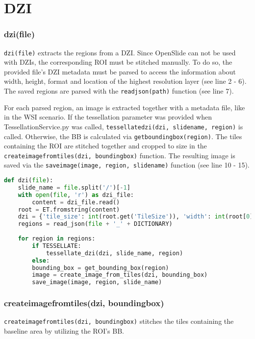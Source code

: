 \section{DZI}

\subsubsection{dzi(file)}
\texttt{dzi(file)} extracts the regions from a DZI. Since OpenSlide can not be used with DZIs, the corresponding ROI must be stitched manually. To do so, the provided file's DZI metadata must be parsed to access the information about width, height, format and location of the highest resolution layer (see line 2 - 6). The saved regions are parsed with the \texttt{read{\textunderscore}json(path)} function (see line 7).

For each parsed region, an image is extracted together with a metadata file, like in the WSI scenario. If the tessellation parameter was provided when TessellationService.py was called, \texttt{tessellate{\textunderscore}dzi(dzi, slide{\textunderscore}name, region)} is called. Otherwise, the BB is calculated via \texttt{get{\textunderscore}bounding{\textunderscore}box(region)}. The tiles containing the ROI are stitched together and cropped to size in the \texttt{create{\textunderscore}image{\textunderscore}from{\textunderscore}tiles(dzi, bounding{\textunderscore}box)} function. The resulting image is saved via the \texttt{save{\textunderscore}image(image, region, slide{\textunderscore}name)} function (see line 10 - 15).

\begin{lstlisting}[frame=single,language=python]
def dzi(file):
	slide_name = file.split('/')[-1]
	with open(file, 'r') as dzi_file:
		content = dzi_file.read()
	root = ET.fromstring(content)
	dzi = {'tile_size': int(root.get('TileSize')), 'width': int(root[0].get('Width')), 'height': int(root[0].get('Height')), 'tile_source': get_tile_source(file), 'format': root.get('Format')}
	regions = read_json(file + '_' + DICTIONARY)
	
	for region in regions:
		if TESSELLATE:
			tessellate_dzi(dzi, slide_name, region)
		else:
		bounding_box = get_bounding_box(region)
		image = create_image_from_tiles(dzi, bounding_box)
		save_image(image, region, slide_name)
\end{lstlisting}


\subsubsection{create{\textunderscore}image{\textunderscore}from{\textunderscore}tiles(dzi, bounding{\textunderscore}box)}
\texttt{create{\textunderscore}image{\textunderscore}from{\textunderscore}tiles(dzi, bounding{\textunderscore}box)} stitches the tiles containing the baseline area by utilizing the ROI's BB.

